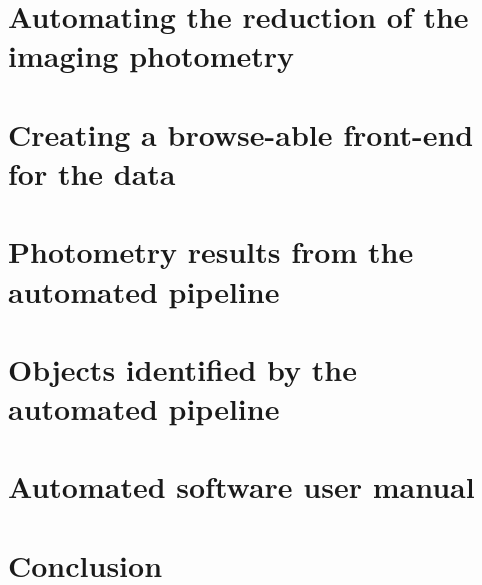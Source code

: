 \documentclass[11pt,a4paper]{report}      %
\begin{document}
\chapter{Automating the reduction of the imaging photometry}\label{chap:datareduction}


\chapter{Creating a browse-able front-end for the data}\label{chap:webfrontend}


\chapter{Photometry results from the automated pipeline}\label{chap:results}


\chapter{Objects identified by the automated pipeline}\label{chap:highlights}


\chapter{Automated software user manual}\label{chap:usermanual}


\chapter{Conclusion}



%  
%  




\end{document}
